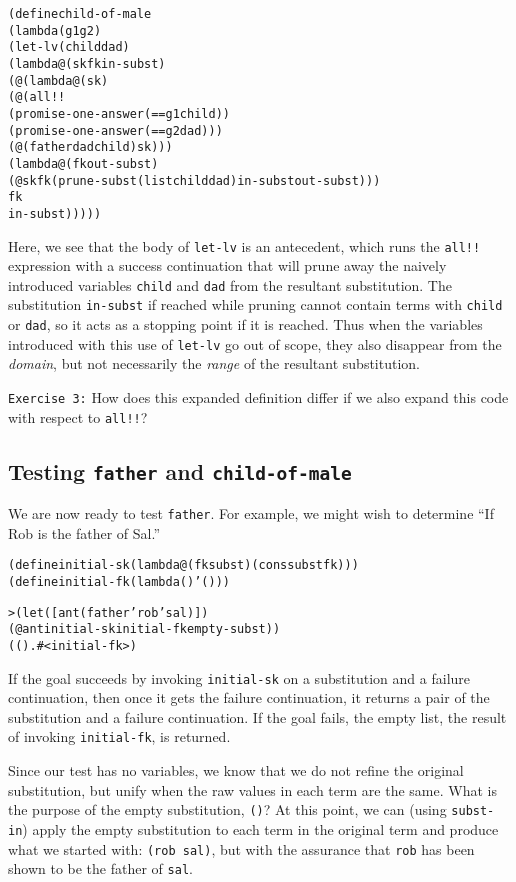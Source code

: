 \begin{alltt}
(define child-of-male
  (lambda (g1 g2)
    (let-lv (child dad)
      (lambda@ (sk fk in-subst)
        (@ (lambda@ (sk)
             (@ (all!!
                  (promise-one-answer (== g1 child))
                  (promise-one-answer (== g2 dad)))
                (@ (father dad child) sk)))
           (lambda@ (fk out-subst)
             (@ sk fk (prune-subst (list child dad) in-subst out-subst)))
           fk
           in-subst)))))
\end{alltt}

Here, we see that the body of \texttt{let-lv} is an antecedent, which
runs the \texttt{all!!} expression with a success continuation that
will prune away the naively introduced variables \texttt{child} and
\texttt{dad} from the resultant substitution.  The substitution
\texttt{in-subst} if reached while pruning cannot contain terms with
\texttt{child} or \texttt{dad}, so it acts as a stopping point if it
is reached.  Thus when the variables introduced with this use of
\texttt{let-lv} go out of scope, they also disappear from the
\emph{domain}, but not necessarily the \emph{range} of the resultant
substitution.

\noindent
\texttt{Exercise 3:} How does this expanded definition differ if we
also expand this code with respect to \texttt{all!!}?\endofexercise

\subsection{Testing \texttt{father} and \texttt{child-of-male}}

We are now ready to test \texttt{father}.  For example, we might wish
to determine ``If Rob is the father of Sal.''

\begin{alltt}
(define initial-sk (lambda@ (fk subst) (cons subst fk)))
(define initial-fk (lambda () '()))

> (let ([ant (father 'rob 'sal)])
    (@ ant initial-sk initial-fk empty-subst))
(() . #<initial-fk>)
\end{alltt}

If the goal succeeds by invoking \texttt{initial-sk} on a substitution
and a failure continuation, then once it gets the failure
continuation, it returns a pair of the substitution and a failure
continuation. If the goal fails, the empty list, the result of
invoking \texttt{initial-fk}, is returned.

Since our test has no variables, we know that we do not refine the
original substitution, but unify when the raw values in each term are
the same.  What is the purpose of the empty substitution, \texttt{()}?
At this point, we can (using \texttt{subst-in}) apply the empty
substitution to each term in the original term and produce what we
started with: \texttt{(rob sal)}, but with the assurance that
\texttt{rob} has been shown to be the father of \texttt{sal}.

